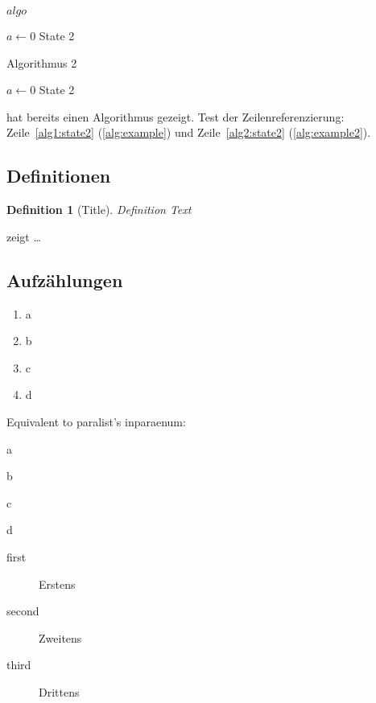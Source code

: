 \documentclass[
  numbers=autoendperiod,
  ngerman,  %
  a4paper,  %
  twoside,  %
  bibliography=totoc,
  headsepline,
  cleardoublepage=empty,
  parskip=half,
  draft=false
]{scrbook}
\theoremstyle{break}
\newtheorem{definition}{Definition}[chapter]
\begin{document}
\begin{algorithm}
  \caption{$algo$}
  \label{alg:example}
  \begin{algorithmic}[1]
    \State $a \gets 0$
    \State State 2\label{alg1:state2}
  \end{algorithmic}
\end{algorithm}

\begin{algorithm}
  \caption{Algorithmus 2}
  \label{alg:example2}
  \begin{algorithmic}[1]
    \State $a \gets 0$
    \State State 2\label{alg2:state2}
  \end{algorithmic}
\end{algorithm}

 hat bereits einen Algorithmus gezeigt.
Test der Zeilenreferenzierung: Zeile~\ref{alg1:state2} (\cref{alg:example}) und Zeile~\ref{alg2:state2} (\cref{alg:example2}).

\subsection{Definitionen}
\begin{definition}[Title]
  \label{def:def1}
  Definition Text
\end{definition}

 zeigt \ldots

\subsection{Aufzählungen}

\begin{enumerate}[label=\alph*)]
  \item a
  \item b
  \item c
  \item d
\end{enumerate}

Equivalent to paralist's inparaenum:
\begin{enumerate*}[label=\alph*)]
  \item a
  \item b
  \item c
  \item d
\end{enumerate*}

\begin{description}
  \item[first] Erstens
  \item[second] Zweitens
  \item[third] Drittens
\end{description}
\end{document}
